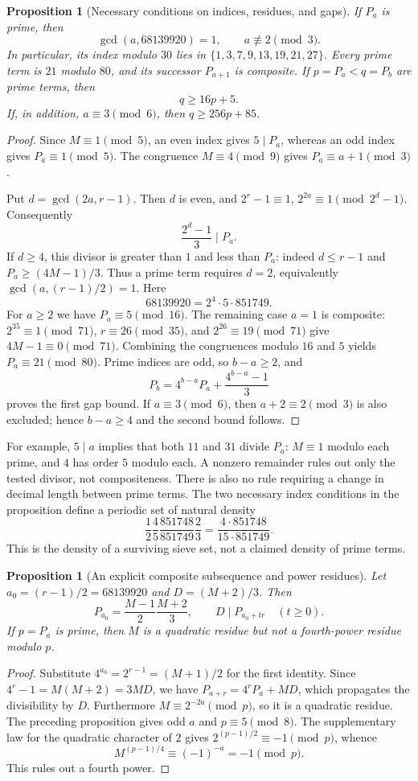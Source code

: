 \documentclass[11pt,a4paper]{article}
\newtheorem{proposition}[theorem]{Proposition}
\theoremstyle{definition}
\theoremstyle{remark}
\numberwithin{equation}{section}
\begin{document}
\begin{proposition}[Necessary conditions on indices, residues, and gaps]
If $P_a$ is prime, then
\[
 \gcd(a,68139920)=1,\qquad a\not\equiv2\pmod3.
\]
In particular, its index modulo $30$ lies in
$\{1,3,7,9,13,19,21,27\}$. Every prime term is $21$ modulo $80$, and its
successor $P_{a+1}$ is composite. If $p=P_a<q=P_b$ are prime terms, then
\[
 q\ge16p+5.
\]
If, in addition, $a\equiv3\pmod6$, then $q\ge256p+85$.
\end{proposition}
\begin{proof}
Since $M\equiv1\pmod5$, an even index gives $5\mid P_a$, whereas an odd
index gives $P_a\equiv1\pmod5$. The congruence $M\equiv4\pmod9$ gives
$P_a\equiv a+1\pmod3$.

Put $d=\gcd(2a,r-1)$. Then $d$ is even, and
$2^r-1\equiv1$, $2^{2a}\equiv1\pmod{2^d-1}$. Consequently
\[
 \frac{2^d-1}{3}\mid P_a.
\]
If $d\ge4$, this divisor is greater than $1$ and less than $P_a$:
indeed $d\le r-1$ and $P_a\ge(4M-1)/3$. Thus a prime term requires $d=2$,
equivalently $\gcd(a,(r-1)/2)=1$. Here
\[
 68139920=2^4\cdot5\cdot851749.
\]
For $a\ge2$ we have $P_a\equiv5\pmod{16}$. The remaining case $a=1$
is composite: $2^{35}\equiv1\pmod{71}$, $r\equiv26\pmod{35}$, and
$2^{26}\equiv19\pmod{71}$ give $4M-1\equiv0\pmod{71}$.
Combining the congruences modulo $16$ and $5$ yields $P_a\equiv21\pmod{80}$.
Prime indices are odd, so $b-a\ge2$, and
\[
 P_b=4^{b-a}P_a+\frac{4^{b-a}-1}{3}
\]
proves the first gap bound. If $a\equiv3\pmod6$, then
$a+2\equiv2\pmod3$ is also excluded; hence $b-a\ge4$ and the second bound
follows.
\end{proof}

For example, $5\mid a$ implies that both $11$ and $31$ divide $P_a$:
$M\equiv1$ modulo each prime, and $4$ has order $5$ modulo each.
A nonzero remainder rules out only the tested divisor, not compositeness.
There is also no rule requiring a change in decimal length between prime
terms. The two necessary index conditions in the proposition define a
periodic set of natural density
\[
 \frac12\frac45\frac{851748}{851749}\frac23
   =\frac{4\cdot851748}{15\cdot851749}.
\]
This is the density of a surviving sieve set, not a claimed density of
prime terms.

\begin{proposition}[An explicit composite subsequence and power residues]
Let $a_0=(r-1)/2=68139920$ and $D=(M+2)/3$. Then
\[
 P_{a_0}=\frac{M-1}{2}\frac{M+2}{3},\qquad
 D\mid P_{a_0+tr}\quad(t\ge0).
\]
If $p=P_a$ is prime, then $M$ is a quadratic residue but not a fourth-power
residue modulo $p$.
\end{proposition}
\begin{proof}
Substitute $4^{a_0}=2^{r-1}=(M+1)/2$ for the first identity. Since
$4^r-1=M(M+2)=3MD$, we have
$P_{a+r}=4^rP_a+MD$, which propagates the divisibility by $D$.
Furthermore $M\equiv2^{-2a}\pmod p$, so it is a quadratic residue.
The preceding proposition gives odd $a$ and $p\equiv5\pmod8$. The
supplementary law for the quadratic character of $2$ gives
$2^{(p-1)/2}\equiv-1\pmod p$, whence
\[
 M^{(p-1)/4}\equiv(-1)^{-a}=-1\pmod p.
\]
This rules out a fourth power.
\end{proof}
\end{document}
